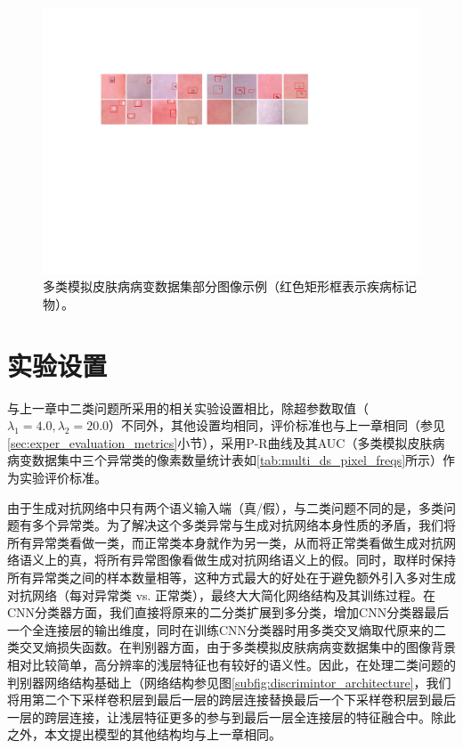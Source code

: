 \begin{figure}[h]
	\centering
	\includegraphics[width=1.0\textwidth]{figure/multi_classes_simulated_skin.pdf}
	\caption[多类模拟皮肤病病变数据集部分图像示例]{多类模拟皮肤病病变数据集部分图像示例（红色矩形框表示疾病标记物）。}
	\label{fig:mul_classes_simulated_ds}
\end{figure}

\section{实验设置}\label{sec:multi_classes_experiment_setting}
与上一章中二类问题所采用的相关实验设置相比，除超参数取值（$\lambda_{1}=4.0,\lambda_{2}=20.0$）不同外，其他设置均相同，评价标准也与上一章相同（参见\ref{sec:exper_evaluation_metrics}小节），采用P-R曲线及其AUC（多类模拟皮肤病病变数据集中三个异常类的像素数量统计表如\ref{tab:multi_ds_pixel_freqs}所示）作为实验评价标准。

由于生成对抗网络中只有两个语义输入端（真/假），与二类问题不同的是，多类问题有多个异常类。为了解决这个多类异常与生成对抗网络本身性质的矛盾，我们将所有异常类看做一类，而正常类本身就作为另一类，从而将正常类看做生成对抗网络语义上的真，将所有异常图像看做生成对抗网络语义上的假。同时，取样时保持所有异常类之间的样本数量相等，这种方式最大的好处在于避免额外引入多对生成对抗网络（每对异常类 vs. 正常类），最终大大简化网络结构及其训练过程。在CNN分类器方面，我们直接将原来的二分类扩展到多分类，增加CNN分类器最后一个全连接层的输出维度，同时在训练CNN分类器时用多类交叉熵取代原来的二类交叉熵损失函数。在判别器方面，由于多类模拟皮肤病病变数据集中的图像背景相对比较简单，高分辨率的浅层特征也有较好的语义性。因此，在处理二类问题的判别器网络结构基础上（网络结构参见图\ref{subfig:discrimintor_architecture}，我们将用第二个下采样卷积层到最后一层的跨层连接替换最后一个下采样卷积层到最后一层的跨层连接，让浅层特征更多的参与到最后一层全连接层的特征融合中。除此之外，本文提出模型的其他结构均与上一章相同。

